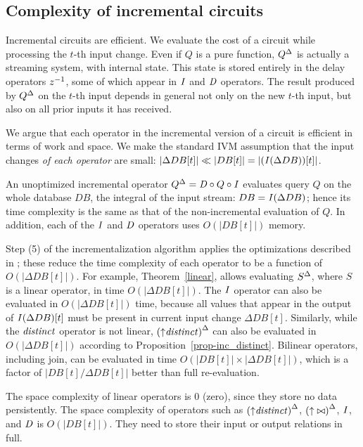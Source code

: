 
\subsection{Complexity of incremental circuits}\label{sec:complexity}

Incremental circuits are efficient.  We evaluate the cost of a circuit
while processing the $t$-th input change.  Even if $Q$ is a pure
function, ${Q}^{\Delta}$ is actually a streaming system, with internal
state.  This state is stored entirely in the delay operators $z^{-1}$,
some of which appear in $\mathit{I}$ and $\mathit{D}$ operators.  The result produced
by ${Q}^{\Delta}$ on the $t$-th input depends in general not only on the
new $t$-th input, but also on all prior inputs it has received.

We argue that each operator in the incremental version of a circuit is
efficient in terms of work and space.  We make the standard IVM
assumption that the input changes \emph{of each operator} are small:
$|\Delta DB[t]| \ll |DB[t]| = |(\mathit{I}(\Delta DB))[t]|$.

An unoptimized incremental operator ${Q}^{\Delta} = \mathit{D} \circ Q \circ \mathit{I}$
evaluates query $Q$ on the whole database $DB$, the integral of the input stream:
$DB = \mathit{I}(\Delta DB)$; hence its time complexity  is the same as that of the non-incremental
evaluation of $Q$.  In addition, each of the $\mathit{I}$ and $\mathit{D}$ operators uses $O(|DB[t]|)$ memory.

Step (5) of the incrementalization algorithm applies the optimizations described in ;
these reduce the time complexity of each operator to be a function of $O(|\Delta DB[t]|)$.
For example, Theorem~\ref{linear}, allows evaluating ${S}^{\Delta}$, where $S$ is a
linear operator, in time $O(|\Delta DB[t]|)$.  The $\mathit{I}$
operator can also be evaluated in $O(|\Delta DB[t]|)$ time, because
all values that appear in the output of $\mathit{I}(\Delta DB)[t]$ must be present in
current input change $\Delta DB[t]$.  Similarly, while the $\mathit{distinct}$ operator is not
linear, ${({\uparrow}\mathit{distinct})}^{\Delta}$ can also be evaluated in $O(|\Delta DB[t]|)$ according to
Proposition~\ref{prop-inc_distinct}.  Bilinear operators, including join, can be
evaluated in time $O(|DB[t]| \times |\Delta DB[t]|)$, which is a factor of $|DB[t] / \Delta DB[t]|$
better than full re-evaluation.

The space complexity of linear operators is 0 (zero), since they store no
data persistently.  The space complexity of operators such as ${({\uparrow}\mathit{distinct})}^{\Delta}$,
${({\uparrow}\bowtie)}^{\Delta}$, $\mathit{I}$, and $\mathit{D}$ is $O(|DB[t]|)$.  They need
to store their input or output relations in full.

